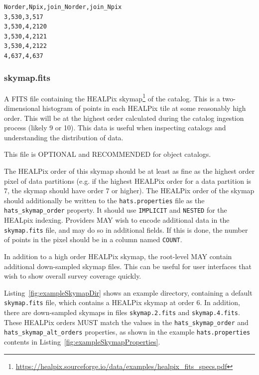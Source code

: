 \documentclass[11pt,a4paper]{ivoa}
\begin{document}
\begin{minipage}{\linewidth}
\begin{lstlisting}[caption=Example \texttt{partition\_join\_info.csv} file contents, label=fig:examplePartitionJoinInfoCsv]    
Norder,Npix,join_Norder,join_Npix
3,530,3,517
3,530,4,2120
3,530,4,2121
3,530,4,2122
4,637,4,637
\end{lstlisting}
\end{minipage}

\subsubsection{skymap.fits} 

A FITS file containing the HEALPix skymap\footnote{\url{https://healpix.sourceforge.io/data/examples/healpix_fits_specs.pdf}} of the catalog.
This is a two-dimensional histogram of points in each HEALPix tile at some reasonably high order.
This will be at the highest order calculated during the catalog ingestion process (likely 9 or 10). 
This data is useful when inspecting catalogs and understanding the distribution of data. 

This file is OPTIONAL and RECOMMENDED for object catalogs.

The HEALPix order of this skymap should be at least as fine as the highest order pixel of data partitions (e.g. if the highest HEALPix order for a data partition is 7, the skymap should have order 7 or higher).
The HEALPix order of the skymap should additionally be written to the \texttt{hats.properties} file
as the \texttt{hats\_skymap\_order} property.
It should use \texttt{IMPLICIT} and \texttt{NESTED} for the HEALpix indexing.
Providers MAY wish to encode additional data in the \texttt{skymap.fits} file, and may do
so in additional fields. If this is done, the number of points in the pixel should be in a 
column named \texttt{COUNT}.

In addition to a high order HEALPix skymap, the root-level MAY contain additional down-sampled skymap files.
This can be useful for user interfaces that wish to show overall survey coverage quickly.

Listing~\ref{fig:exampleSkymapDir} shows an example directory, containing a default \texttt{skymap.fits} file, 
which contains a HEALPix skymap at order 6. In addition, there are down-sampled skymaps in files \texttt{skymap.2.fits} and \texttt{skymap.4.fits}. 
These HEALPix orders MUST match the values in the \texttt{hats\_skymap\_order} and \texttt{hats\_skymap\_alt\_orders} properties,
as shown in the example \texttt{hats.properties} contents in Listing~\ref{fig:exampleSkymapProperties}.
\end{document}
